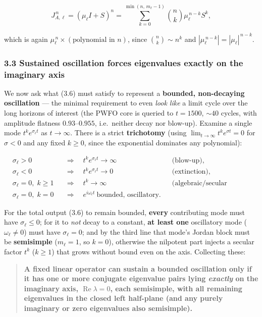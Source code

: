 \documentclass[
  11pt,
]{article}
\providecommand{\lt}{<}
\providecommand{\gt}{>}
\begin{document}
\[
J_{A,\ell}^{\,n}=(\mu_\ell I+S)^{n}=\sum_{k=0}^{\min(n,\,m_\ell-1)}\binom{n}{k}\mu_\ell^{\,n-k}S^{k},
\]

which is again \(\mu_\ell^{\,n}\times(\text{polynomial in }n)\), since
\(\binom{n}{k}\sim n^{k}\) and
\(|\mu_\ell^{\,n-k}|=|\mu_\ell|^{\,n-k}\).

\subsubsection{3.3 Sustained oscillation forces eigenvalues exactly on
the imaginary
axis}\label{sustained-oscillation-forces-eigenvalues-exactly-on-the-imaginary-axis}

We now ask what (3.6) must satisfy to represent a \textbf{bounded,
non-decaying oscillation} --- the minimal requirement to even \emph{look
like} a limit cycle over the long horizons of interest (the PWFO core is
queried to \(t=1500\), \(\sim 40\) cycles, with amplitude flatness
\(0.93\)--\(0.955\), i.e.~neither decay nor blow-up). Examine a single
mode \(t^{k}e^{\sigma_\ell t}\) as \(t\to\infty\). There is a strict
\textbf{trichotomy} (using \(\lim_{t\to\infty}t^{k}e^{\sigma t}=0\) for
\(\sigma\lt 0\) and any fixed \(k\ge0\), since the exponential dominates
any polynomial):

\[
\begin{aligned}
&\sigma_\ell\gt 0 &&\Longrightarrow\quad t^{k}e^{\sigma_\ell t}\to\infty
&&\text{(blow-up),}\\
&\sigma_\ell\lt 0 &&\Longrightarrow\quad t^{k}e^{\sigma_\ell t}\to 0
&&\text{(extinction),}\\
&\sigma_\ell=0,\;k\ge 1 &&\Longrightarrow\quad t^{k}\to\infty
&&\text{(algebraic/secular growth),}\\
&\sigma_\ell=0,\;k=0 &&\Longrightarrow\quad e^{i\omega_\ell t}\ \text{bounded, oscillatory.}
\end{aligned}
\tag{3.7}
\]

For the total output (3.6) to remain bounded, \textbf{every}
contributing mode must have \(\sigma_\ell\le 0\); for it to \emph{not}
decay to a constant, \textbf{at least one} oscillatory mode
(\(\omega_\ell\ne 0\)) must have \(\sigma_\ell = 0\); and by the third
line that mode's Jordan block must be \textbf{semisimple} (\(m_\ell=1\),
so \(k=0\)), otherwise the nilpotent part injects a secular factor
\(t^k\) (\(k\ge1\)) that grows without bound even on the axis.
Collecting these:

\begin{quote}
\textbf{A fixed linear operator can sustain a bounded oscillation only
if it has one or more conjugate eigenvalue pairs lying \emph{exactly} on
the imaginary axis, \(\operatorname{Re}\lambda = 0\), each semisimple,
with all remaining eigenvalues in the closed left half-plane (and any
purely imaginary or zero eigenvalues also semisimple).}
\end{quote}
\end{document}

